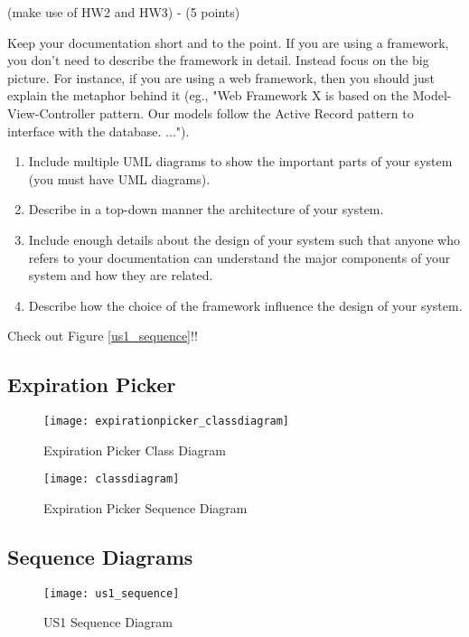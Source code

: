 (make use of HW2 and HW3) - (5 points)

Keep your documentation short and to the point. If you are using a framework, you don't need to describe the framework in detail. Instead focus on the big picture. For instance, if you are using a web framework, then you should just explain the metaphor behind it (eg., "Web Framework X is based on the Model-View-Controller pattern. Our models follow the Active Record pattern to interface with the database. ...").

\begin{enumerate}
	\item Include multiple UML diagrams to show the important parts of your system (you must have UML diagrams).
	\item Describe in a top-down manner the architecture of your system.
	\item Include enough details about the design of your system such that anyone who refers to your documentation can understand the major components of your system and how they are related.
	\item Describe how the choice of the framework influence the design of your system.
\end{enumerate}

Check out Figure \ref{us1_sequence}!!

\renewcommand\listfigurename{List of Diagrams}
\listoffigures

\subsection{Expiration Picker}
\begin{figure}[H]
    \centering
    \texttt{[image: expirationpicker\_classdiagram]}
    \caption{Expiration Picker Class Diagram}
    \label{fig:expirationpicker_classdiagram}
\end{figure}

\begin{figure}[H]
    \centering
    \texttt{[image: classdiagram]}
    \caption{Expiration Picker Sequence Diagram}
    \label{fig:expirationpicker_sequence}
\end{figure}

\subsection{Sequence Diagrams}
\begin{figure}[H]
    \centering
    \texttt{[image: us1\_sequence]}
    \caption{US1 Sequence Diagram}
    \label{fig:us1_sequence}
\end{figure}

